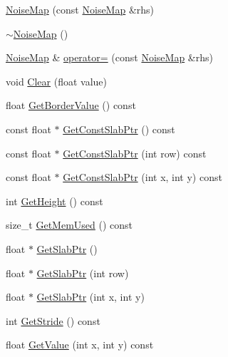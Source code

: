 \begin{DoxyCompactItemize}
\item 
\hyperlink{classnoise_1_1utils_1_1_noise_map_a48b60dcd08c3b74f20e55c9cccfa1c13}{Noise\+Map} (const \hyperlink{classnoise_1_1utils_1_1_noise_map}{Noise\+Map} \&rhs)
\item 
\hyperlink{classnoise_1_1utils_1_1_noise_map_a1cec095839c98e3dfc2be3fc6035ebd6}{$\sim$\+Noise\+Map} ()
\item 
\hyperlink{classnoise_1_1utils_1_1_noise_map}{Noise\+Map} \& \hyperlink{classnoise_1_1utils_1_1_noise_map_ae91177f23fe8bdceb00f1b78728f479c}{operator=} (const \hyperlink{classnoise_1_1utils_1_1_noise_map}{Noise\+Map} \&rhs)
\item 
void \hyperlink{classnoise_1_1utils_1_1_noise_map_a11d55cc96a2bdef52eaf0c3bf13c75eb}{Clear} (float value)
\item 
float \hyperlink{classnoise_1_1utils_1_1_noise_map_a17d169bc76ca1a221b2ff4f4a721948e}{Get\+Border\+Value} () const 
\item 
const float $\ast$ \hyperlink{classnoise_1_1utils_1_1_noise_map_a7e9fc390a2fb33ab1b1d65e072bdaeee}{Get\+Const\+Slab\+Ptr} () const 
\item 
const float $\ast$ \hyperlink{classnoise_1_1utils_1_1_noise_map_ac2ecdd8f49d7ce27d88a90de032e2852}{Get\+Const\+Slab\+Ptr} (int row) const 
\item 
const float $\ast$ \hyperlink{classnoise_1_1utils_1_1_noise_map_afa59a46d21340363c440d1a80c17b1b0}{Get\+Const\+Slab\+Ptr} (int x, int y) const 
\item 
int \hyperlink{classnoise_1_1utils_1_1_noise_map_a8d29226f2e0300e5738556cde3214ff9}{Get\+Height} () const 
\item 
size\+\_\+t \hyperlink{classnoise_1_1utils_1_1_noise_map_acf3096d720e21b69d5c77a3483601436}{Get\+Mem\+Used} () const 
\item 
float $\ast$ \hyperlink{classnoise_1_1utils_1_1_noise_map_aed156da712e668ce73769121e11c2660}{Get\+Slab\+Ptr} ()
\item 
float $\ast$ \hyperlink{classnoise_1_1utils_1_1_noise_map_a7470c6d553db47b6527ed04e9b5874c3}{Get\+Slab\+Ptr} (int row)
\item 
float $\ast$ \hyperlink{classnoise_1_1utils_1_1_noise_map_aae1eaab13e26253382e79b75c3ab1a78}{Get\+Slab\+Ptr} (int x, int y)
\item 
int \hyperlink{classnoise_1_1utils_1_1_noise_map_af57bca1cd431312dcbe80056012224ed}{Get\+Stride} () const 
\item 
float \hyperlink{classnoise_1_1utils_1_1_noise_map_a5e395945fbe8b247a9eeb4609142f930}{Get\+Value} (int x, int y) const 

\end{DoxyCompactItemize}
